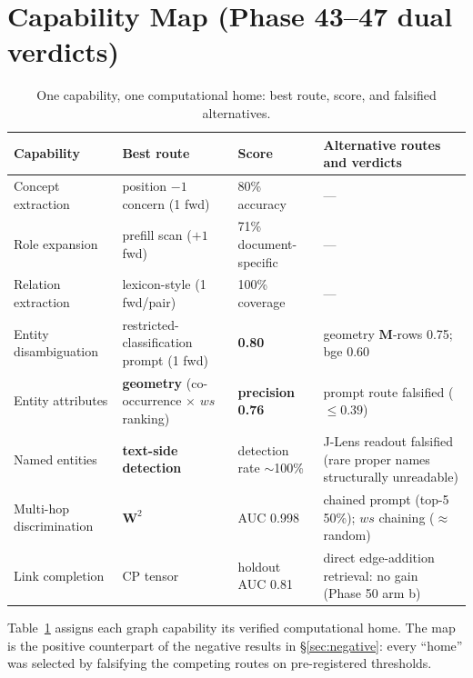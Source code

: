 \section{Capability Map (Phase 43--47 dual verdicts)}
\label{sec:capability}

\begin{table}[t]
\centering
\caption{One capability, one computational home: best route, score, and falsified alternatives.}
\label{tab:capability}
\begin{tabular}{@{}lllp{4.6cm}@{}}
\toprule
Capability & Best route & Score & Alternative routes and verdicts \\
\midrule
Concept extraction & position $-1$ concern (1 fwd) & 80\% accuracy & --- \\
Role expansion & prefill scan ($+1$ fwd) & 71\% document-specific & --- \\
Relation extraction & lexicon-style (1 fwd/pair) & 100\% coverage & --- \\
Entity disambiguation & restricted-classification prompt (1 fwd) & \textbf{0.80} & geometry $\mathbf{M}$-rows 0.75; bge 0.60 \\
Entity attributes & \textbf{geometry} (co-occurrence $\times$ $ws$ ranking) & \textbf{precision 0.76} & prompt route falsified ($\leq 0.39$) \\
Named entities & \textbf{text-side detection} & detection rate $\sim$100\% & J-Lens readout falsified (rare proper names structurally unreadable) \\
Multi-hop discrimination & \textbf{$\mathbf{W}^2$} & AUC 0.998 & chained prompt (top-5 50\%); $ws$ chaining ($\approx$ random) \\
Link completion & CP tensor & holdout AUC 0.81 & direct edge-addition retrieval: no gain (Phase 50 arm b) \\
\bottomrule
\end{tabular}
\end{table}

Table~\ref{tab:capability} assigns each graph capability its verified
computational home. The map is the positive counterpart of the negative results
in \S\ref{sec:negative}: every ``home'' was selected by falsifying the
competing routes on pre-registered thresholds.
